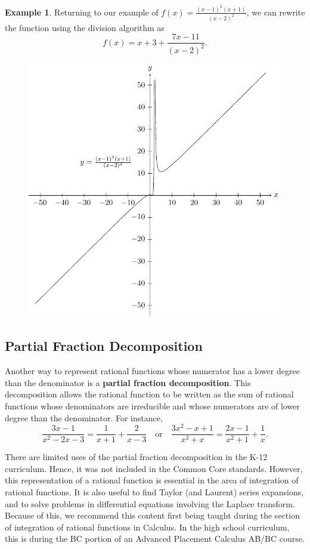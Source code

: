 \documentclass[
]{book}
\theoremstyle{definition}
\theoremstyle{definition}
\newtheorem{example}{Example}[chapter]
\theoremstyle{definition}
\theoremstyle{remark}
\begin{document}
\begin{example}
\protect\hypertarget{exm:unnamed-chunk-229}{}{\label{exm:unnamed-chunk-229} }Returning to our example of \(f(x)=\frac{(x-1)^2(x+1)}{(x-2)^2}\), we can rewrite the function using the division algorithm as
\[f(x)= x+3 + \frac{7x-11}{(x-2)^2}.\]
\end{example}
\begin{figure}

{\centering \includegraphics[width=0.5\linewidth]{tikz/rational5} 

}

\end{figure}

\hypertarget{partial-fraction-decomposition}{%
\subsection{Partial Fraction Decomposition}\label{partial-fraction-decomposition}}

Another way to represent rational functions whose numerator has a lower degree than the denominator is a \textbf{partial fraction decomposition}. This decomposition allows the rational function to be written as the sum of rational functions whose denominators are irreducible and whose numerators are of lower degree than the denominator. For instance,
\[\frac{3x-1}{x^2-2x-3} = \frac{1}{x+1} + \frac{2}{x-3}\quad \mbox{or} \quad \frac{3x^2-x+1}{x^3+x} = \frac{2x-1}{x^2+1} + \frac{1}{x}.\]

There are limited uses of the partial fraction decomposition in the K-12 curriculum. Hence, it was not included in the Common Core standards. However, this representation of a rational function is essential in the area of integration of rational functions. It is also useful to find Taylor (and Laurent) series expansions, and to solve problems in differential equations involving the Laplace transform. Because of this, we recommend this content first being taught during the section of integration of rational functions in Calculus. In the high school curriculum, this is during the BC portion of an Advanced Placement Calculus AB/BC course.
\end{document}

